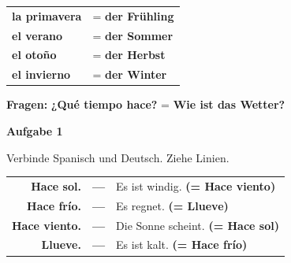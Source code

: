 \documentclass[11pt, a4paper]{article}
\newcommand{\fachfarbe}{spanisch}
\newcommand{\punktebox}[1]{\hfill\fbox{\small \_/#1}}
\newcommand{\loesung}[1]{\textcolor{loesung}{\textbf{#1}}}
\newenvironment{aufgabe}[1]{%
    \needspace{5\baselineskip}%
    \nopagebreak[4]%
    \vspace{10pt}
    \noindent\textbf{\textcolor{\fachfarbe}{Aufgabe #1}}
    \nopagebreak[4]%
    \vspace{5pt}
    \nopagebreak[4]%
    \begin{list}{}{\leftmargin=0pt}
    \item[]
}{%
    \end{list}
}
\newcommand{\es}[1]{\textcolor{\fachfarbe}{\textbf{#1}}}
\begin{document}
\vspace{10pt}


\begin{merkkasten}

\vspace{0.5em}

\begin{tabular}{ll}
\es{la primavera} & = \loesung{der Frühling} \\[0.8em]
\es{el verano} & = \loesung{der Sommer} \\[0.8em]
\es{el otoño} & = \loesung{der Herbst} \\[0.8em]
\es{el invierno} & = \loesung{der Winter} \\
\end{tabular}

\vspace{0.5em}

\textbf{Fragen:} \es{¿Qué tiempo hace?} = \loesung{Wie ist das Wetter?}
\end{merkkasten}

\vspace{15pt}


\begin{aufgabe}{1}
Verbinde Spanisch und Deutsch. Ziehe Linien. \punktebox{4}
\end{aufgabe}

\begin{center}
\begin{tabular}{rcl}
\es{Hace sol.} & \loesung{---} & Es ist windig. \loesung{(= Hace viento)} \\[0.8em]
\es{Hace frío.} & \loesung{---} & Es regnet. \loesung{(= Llueve)} \\[0.8em]
\es{Hace viento.} & \loesung{---} & Die Sonne scheint. \loesung{(= Hace sol)} \\[0.8em]
\es{Llueve.} & \loesung{---} & Es ist kalt. \loesung{(= Hace frío)} \\
\end{tabular}
\end{center}
\end{document}
